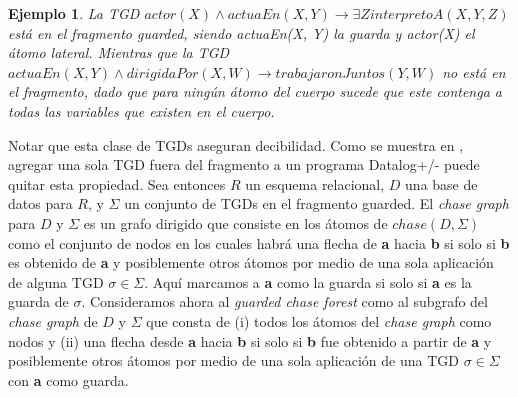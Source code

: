 \documentclass[11pt,a4paper,twoside]{tesis}
\newtheorem{exmp}{Ejemplo}
\begin{document}
\begin{exmp}\label{ejemplo_guarded}
    La TGD $actor(X) \land actuaEn(X, Y) \rightarrow \exists Z interpretoA(X, Y, Z)$ está en el fragmento \textit{guarded}, siendo \textit{actuaEn(X, Y)} la guarda y \textit{actor(X)} el átomo lateral. Mientras que la TGD $actuaEn(X, Y) \land dirigidaPor(X, W) \rightarrow trabajaronJuntos(Y, W)$ no está en el fragmento, dado que para ningún átomo del cuerpo sucede que este contenga a todas las variables que existen en el cuerpo. 
\end{exmp}
Notar que esta clase de TGDs aseguran decibilidad. Como se muestra en \cite{cali}, agregar una sola TGD fuera del fragmento a un programa Datalog+/- puede quitar esta propiedad.
Sea entonces $R$ un esquema relacional, $D$ una base de datos para $R$, y $\Sigma$ un conjunto de TGDs en el fragmento guarded. El \textit{chase graph} para $D$ y $\Sigma$ es un grafo dirigido que consiste en los átomos de $chase(D,\Sigma)$ como el conjunto de nodos en los cuales habrá una flecha de \textbf{a} hacia \textbf{b} si solo si \textbf{b} es obtenido de \textbf{a} y posiblemente otros átomos por medio de una sola aplicación de alguna TGD $\sigma \in \Sigma$. Aquí marcamos a \textbf{a} como la guarda si solo si \textbf{a} es la guarda de $\sigma$. Consideramos ahora al \textit{guarded chase forest} como al subgrafo del \textit{chase graph} de $D$ y $\Sigma$ que consta de (i) todos los átomos del \textit{chase graph} como nodos y (ii) una flecha desde \textbf{a} hacia \textbf{b} si solo si \textbf{b} fue obtenido a partir de \textbf{a} y posiblemente otros átomos por medio de una sola aplicación de una TGD $\sigma \in \Sigma$ con \textbf{a} como guarda.
\end{document}
